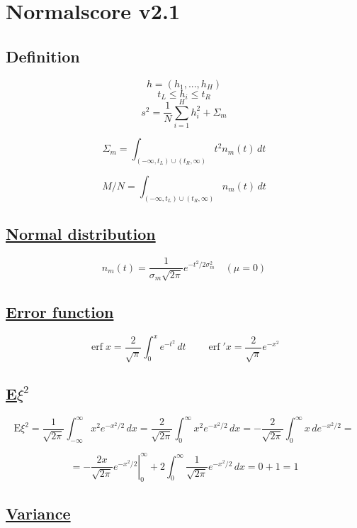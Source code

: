 \documentclass[12pt]{article}
\begin{document}
\section*{Normalscore v2.1}

\subsection*{Definition}

\[ h = (h_1, ..., h_H) \]
\[ t_L \leq h_i \leq t_R \]
\[
s^2 =
\frac{1}{N} \sum_{i = 1}^{H} h_i^2 + \Sigma_m
\]

\begin{equation}
\Sigma_m = \int_{(-\infty, t_L) \cup (t_R, \infty)} t^2 n_m(t) \,dt
\label{eq:def_Sigma_m}
\end{equation}

\[
M / N = \int_{(-\infty, t_L) \cup (t_R, \infty)} n_m(t) \,dt
\]

\subsection*{\href{https://en.wikipedia.org/wiki/Normal_distribution}{Normal distribution}}

\[
n_m(t) = \frac{1}{\sigma_m\sqrt{2 \pi }} e^{-t^2/2\sigma_m^2} \quad (\mu = 0)
\]

\subsection*{\href{https://en.wikipedia.org/wiki/Error_function}{Error function}}

\[
\operatorname{erf} x = \frac{2}{\sqrt{\pi}} \int_{0}^{x} e^{-t^2} \,dt
\quad\quad
\operatorname{erf}'x = \frac{2}{\sqrt{\pi}} e^{-x^{2}}
\]

\subsection*{\href{https://tvims.nsu.ru/chernova/tv/lec/node46.html}{E\(\xi^2\)}}

\[
\text{E}\xi^2 = \frac{1}{\sqrt{2\pi}} \int_{-\infty}^{\infty} x^2 e^{-x^2/2} \,dx =
\frac{2}{\sqrt{2\pi}} \int_{0}^{\infty} x^2 e^{-x^2/2} \,dx =
-\frac{2}{\sqrt{2\pi}} \int_{0}^{\infty} x \,de^{-x^2/2} =
\]

\[
= \left. -\frac{2x}{\sqrt{2\pi}} e^{-x^2/2} \right|_0^\infty +
2 \int_{0}^{\infty} \frac{1}{\sqrt{2\pi}} e^{-x^2/2} \,dx = 0 + 1 = 1
\]

\subsection*{\href{https://en.wikipedia.org/wiki/Variance}{Variance}}
\end{document}
